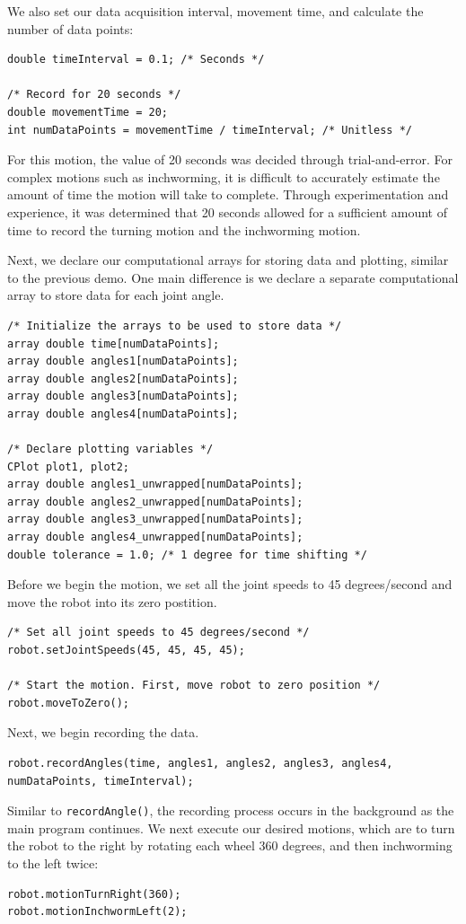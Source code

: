 \documentclass{article}
\begin{document}
We also set our data acquisition interval, movement time, and calculate
the number of data points:
\begin{verbatim}
double timeInterval = 0.1; /* Seconds */

/* Record for 20 seconds */
double movementTime = 20;
int numDataPoints = movementTime / timeInterval; /* Unitless */
\end{verbatim}
For this motion, the value of 20 seconds was decided through trial-and-error.
For complex motions such as inchworming, it is difficult to accurately estimate the 
amount of time the motion will take to complete. Through experimentation and experience,
it was determined that 20 seconds allowed for a sufficient amount of time to record the 
turning motion and the inchworming motion. 

Next, we declare our computational arrays for storing data and plotting, similar to 
the previous demo. One main difference is we declare a separate computational array
to store data for each joint angle.
\begin{verbatim}
/* Initialize the arrays to be used to store data */
array double time[numDataPoints];
array double angles1[numDataPoints];
array double angles2[numDataPoints];
array double angles3[numDataPoints];
array double angles4[numDataPoints];

/* Declare plotting variables */
CPlot plot1, plot2;
array double angles1_unwrapped[numDataPoints];
array double angles2_unwrapped[numDataPoints];
array double angles3_unwrapped[numDataPoints];
array double angles4_unwrapped[numDataPoints];
double tolerance = 1.0; /* 1 degree for time shifting */
\end{verbatim}

Before we begin the motion, we set all the joint speeds to 45 degrees/second
and move the robot into its zero postition.
\begin{verbatim}
/* Set all joint speeds to 45 degrees/second */
robot.setJointSpeeds(45, 45, 45, 45);

/* Start the motion. First, move robot to zero position */
robot.moveToZero();
\end{verbatim}

Next, we begin recording the data.
\begin{verbatim}
robot.recordAngles(time, angles1, angles2, angles3, angles4, numDataPoints, timeInterval);
\end{verbatim}

Similar to \texttt{recordAngle()}, the recording process occurs in the background as
the main program continues. We next execute our desired motions, which are to turn the
robot to the right by rotating each wheel 360 degrees, and then inchworming to
the left twice:
\begin{verbatim}
robot.motionTurnRight(360);
robot.motionInchwormLeft(2);
\end{verbatim}
\end{document}
